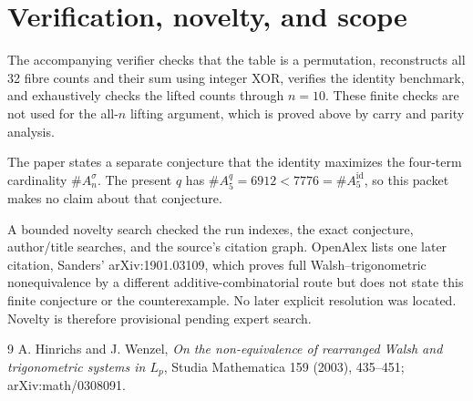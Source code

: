 \documentclass[11pt]{article}
\begin{document}
\section*{Verification, novelty, and scope}

The accompanying verifier checks that the table is a permutation, reconstructs
all 32 fibre counts and their sum using integer XOR, verifies the identity
benchmark, and exhaustively checks the lifted counts through $n=10$.  These
finite checks are not used for the all-$n$ lifting argument, which is proved
above by carry and parity analysis.

The paper states a separate conjecture that the identity maximizes the
four-term cardinality $\#A_n^\sigma$.  The present $q$ has
$\#A_5^q=6912<7776=\#A_5^{\mathrm{id}}$, so this packet makes no claim about
that conjecture.

A bounded novelty search checked the run indexes, the exact conjecture,
author/title searches, and the source's citation graph.  OpenAlex lists one
later citation, Sanders' arXiv:1901.03109, which proves full Walsh--trigonometric
nonequivalence by a different additive-combinatorial route but does not state
this finite conjecture or the counterexample.  No later explicit resolution
was located.  Novelty is therefore provisional pending expert search.

\begin{thebibliography}{9}
A. Hinrichs and J. Wenzel,
\emph{On the non-equivalence of rearranged Walsh and trigonometric systems in
$L_p$}, Studia Mathematica 159 (2003), 435--451;
arXiv:math/0308091.
\end{thebibliography}
\end{document}
